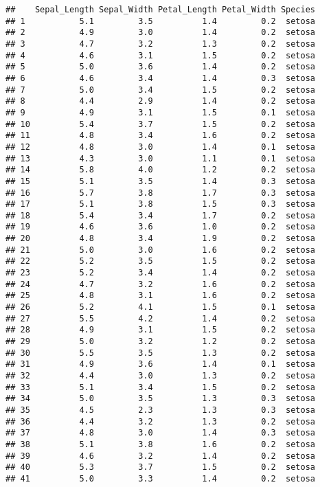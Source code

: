 \documentclass[
]{article}
\begin{document}
\begin{verbatim}
##    Sepal_Length Sepal_Width Petal_Length Petal_Width Species
## 1           5.1         3.5          1.4         0.2  setosa
## 2           4.9         3.0          1.4         0.2  setosa
## 3           4.7         3.2          1.3         0.2  setosa
## 4           4.6         3.1          1.5         0.2  setosa
## 5           5.0         3.6          1.4         0.2  setosa
## 6           4.6         3.4          1.4         0.3  setosa
## 7           5.0         3.4          1.5         0.2  setosa
## 8           4.4         2.9          1.4         0.2  setosa
## 9           4.9         3.1          1.5         0.1  setosa
## 10          5.4         3.7          1.5         0.2  setosa
## 11          4.8         3.4          1.6         0.2  setosa
## 12          4.8         3.0          1.4         0.1  setosa
## 13          4.3         3.0          1.1         0.1  setosa
## 14          5.8         4.0          1.2         0.2  setosa
## 15          5.1         3.5          1.4         0.3  setosa
## 16          5.7         3.8          1.7         0.3  setosa
## 17          5.1         3.8          1.5         0.3  setosa
## 18          5.4         3.4          1.7         0.2  setosa
## 19          4.6         3.6          1.0         0.2  setosa
## 20          4.8         3.4          1.9         0.2  setosa
## 21          5.0         3.0          1.6         0.2  setosa
## 22          5.2         3.5          1.5         0.2  setosa
## 23          5.2         3.4          1.4         0.2  setosa
## 24          4.7         3.2          1.6         0.2  setosa
## 25          4.8         3.1          1.6         0.2  setosa
## 26          5.2         4.1          1.5         0.1  setosa
## 27          5.5         4.2          1.4         0.2  setosa
## 28          4.9         3.1          1.5         0.2  setosa
## 29          5.0         3.2          1.2         0.2  setosa
## 30          5.5         3.5          1.3         0.2  setosa
## 31          4.9         3.6          1.4         0.1  setosa
## 32          4.4         3.0          1.3         0.2  setosa
## 33          5.1         3.4          1.5         0.2  setosa
## 34          5.0         3.5          1.3         0.3  setosa
## 35          4.5         2.3          1.3         0.3  setosa
## 36          4.4         3.2          1.3         0.2  setosa
## 37          4.8         3.0          1.4         0.3  setosa
## 38          5.1         3.8          1.6         0.2  setosa
## 39          4.6         3.2          1.4         0.2  setosa
## 40          5.3         3.7          1.5         0.2  setosa
## 41          5.0         3.3          1.4         0.2  setosa
\end{verbatim}
\end{document}
